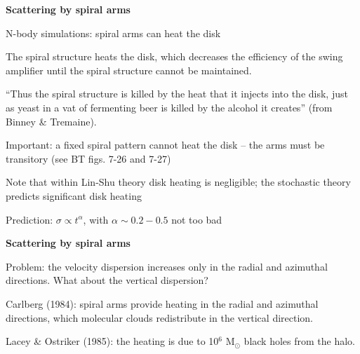 \documentclass[letterpaper,landscape]{slides}
\begin{document}


\begin{slide}

{\color{blue} \bf Scattering by spiral arms} 

N-body simulations: spiral arms can heat the disk

The spiral structure heats the disk, which decreases the 
efficiency of the swing amplifier until the spiral structure
cannot be maintained. 

{\color{blue} ``Thus the spiral structure is killed by the 
heat that it injects into the disk, just as yeast in a vat of
fermenting beer is killed by the alcohol it creates'' (from Binney
\& Tremaine).} 

Important: a fixed spiral pattern cannot heat the disk -- the
arms must be transitory (see BT figs. 7-26 and 7-27)

Note that within Lin-Shu theory disk heating is negligible;
the stochastic theory predicts significant disk heating

{\color{blue} Prediction: $\sigma \propto t^{\alpha}$, with
$\alpha\sim0.2-0.5$} not too bad



\vfill
\end{slide}





\begin{slide}

{\color{blue} \bf Scattering by spiral arms} 

Problem: the velocity dispersion increases only in the
radial and azimuthal directions. What about the vertical
dispersion? 

Carlberg (1984): spiral arms provide heating in the radial and azimuthal 
directions, which molecular clouds redistribute in the vertical direction.

Lacey \& Ostriker (1985): the heating is due to 10$^6$ M$_\odot$ 
black holes from the halo.



\vfill
\end{slide}

\end{document}
